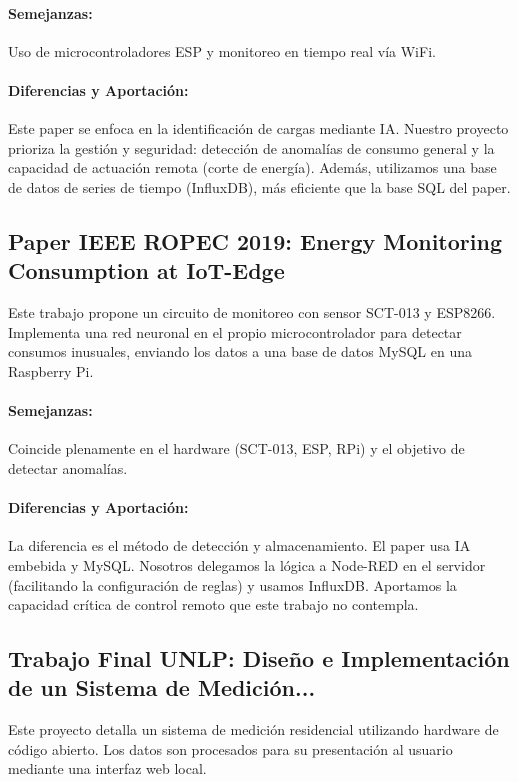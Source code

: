         \paragraph{Semejanzas:} Uso de microcontroladores ESP y monitoreo en tiempo real vía WiFi.
        \paragraph{Diferencias y Aportación:} Este paper se enfoca en la identificación de cargas mediante IA.
        Nuestro proyecto prioriza la gestión y seguridad: detección de anomalías de consumo general y la capacidad de actuación remota (corte de energía).
        Además, utilizamos una base de datos de series de tiempo (InfluxDB), más eficiente que la base SQL del paper.
    \subsection{Paper IEEE ROPEC 2019: Energy Monitoring Consumption at IoT-Edge}
    Este trabajo propone un circuito de monitoreo con sensor SCT-013 y ESP8266.
    Implementa una red neuronal en el propio microcontrolador para detectar consumos inusuales, enviando los datos a una base de datos MySQL en una Raspberry Pi.
    \cite{AguirreNunez2019}

        \paragraph{Semejanzas:} Coincide plenamente en el hardware (SCT-013, ESP, RPi) y el objetivo de detectar anomalías.
        \paragraph{Diferencias y Aportación:} La diferencia es el método de detección y almacenamiento. El paper usa IA embebida y MySQL.
        Nosotros delegamos la lógica a Node-RED en el servidor (facilitando la configuración de reglas) y usamos InfluxDB.
        Aportamos la capacidad crítica de control remoto que este trabajo no contempla.
    \subsection{Trabajo Final UNLP: Diseño e Implementación de un Sistema de Medición...}
    Este proyecto detalla un sistema de medición residencial utilizando hardware de código abierto.
    Los datos son procesados para su presentación al usuario mediante una interfaz web local.
    \cite{Cicutti2019}

